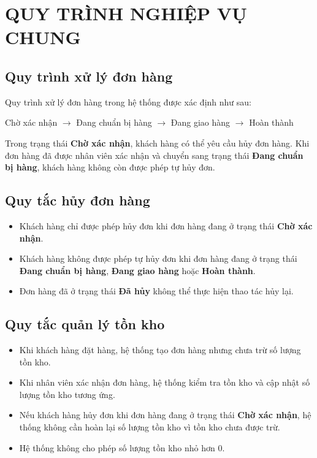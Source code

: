 \documentclass[12pt,a4paper]{article}
\begin{document}
\section{QUY TRÌNH NGHIỆP VỤ CHUNG}

\subsection*{Quy trình xử lý đơn hàng}

Quy trình xử lý đơn hàng trong hệ thống được xác định như sau:

\begin{center}
Chờ xác nhận $\rightarrow$ Đang chuẩn bị hàng $\rightarrow$ Đang giao hàng $\rightarrow$ Hoàn thành
\end{center}

Trong trạng thái \textbf{Chờ xác nhận}, khách hàng có thể yêu cầu hủy đơn hàng. Khi đơn hàng đã được nhân viên xác nhận và chuyển sang trạng thái \textbf{Đang chuẩn bị hàng}, khách hàng không còn được phép tự hủy đơn.

\subsection*{Quy tắc hủy đơn hàng}

\begin{itemize}

    \item Khách hàng chỉ được phép hủy đơn khi đơn hàng đang ở trạng thái \textbf{Chờ xác nhận}.

    \item Khách hàng không được phép tự hủy đơn khi đơn hàng đang ở trạng thái \textbf{Đang chuẩn bị hàng}, \textbf{Đang giao hàng} hoặc \textbf{Hoàn thành}.

    \item Đơn hàng đã ở trạng thái \textbf{Đã hủy} không thể thực hiện thao tác hủy lại.

\end{itemize}

\subsection*{Quy tắc quản lý tồn kho}

\begin{itemize}

    \item Khi khách hàng đặt hàng, hệ thống tạo đơn hàng nhưng chưa trừ số lượng tồn kho.

    \item Khi nhân viên xác nhận đơn hàng, hệ thống kiểm tra tồn kho và cập nhật số lượng tồn kho tương ứng.

    \item Nếu khách hàng hủy đơn khi đơn hàng đang ở trạng thái \textbf{Chờ xác nhận}, hệ thống không cần hoàn lại số lượng tồn kho vì tồn kho chưa được trừ.

    \item Hệ thống không cho phép số lượng tồn kho nhỏ hơn 0.

\end{itemize}
\end{document}
